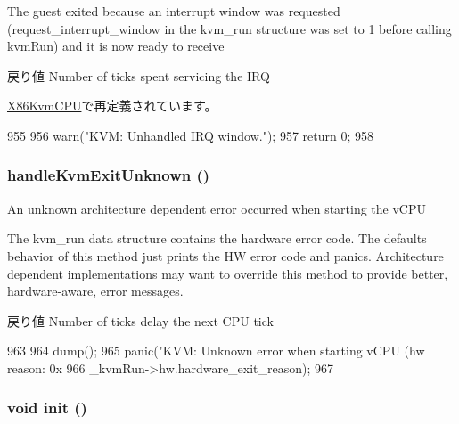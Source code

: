 The guest exited because an interrupt window was requested (request\_\-interrupt\_\-window in the kvm\_\-run structure was set to 1 before calling kvmRun) and it is now ready to receive

\begin{DoxyReturn}{戻り値}
Number of ticks spent servicing the IRQ 
\end{DoxyReturn}


\hyperlink{classX86KvmCPU_a405e34c9d079e8823ac2a1ca0e816a47}{X86KvmCPU}で再定義されています。


\begin{DoxyCode}
955 {
956     warn("KVM: Unhandled IRQ window.\n");
957     return 0;
958 }
\end{DoxyCode}
\hypertarget{classBaseKvmCPU_a00e63a4b01cf730bba2c42ef852b0876}{
\subsubsection[{handleKvmExitUnknown}]{ handleKvmExitUnknown ()}}
\label{classBaseKvmCPU_a00e63a4b01cf730bba2c42ef852b0876}
An unknown architecture dependent error occurred when starting the vCPU

The kvm\_\-run data structure contains the hardware error code. The defaults behavior of this method just prints the HW error code and panics. Architecture dependent implementations may want to override this method to provide better, hardware-\/aware, error messages.

\begin{DoxyReturn}{戻り値}
Number of ticks delay the next CPU tick 
\end{DoxyReturn}



\begin{DoxyCode}
963 {
964     dump();
965     panic("KVM: Unknown error when starting vCPU (hw reason: 0x%
966           _kvmRun->hw.hardware_exit_reason);
967 }
\end{DoxyCode}
\hypertarget{classBaseKvmCPU_a02fd73d861ef2e4aabb38c0c9ff82947}{
\subsubsection[{init}]{\setlength{\rightskip}{0pt plus 5cm}void init ()}}
\label{classBaseKvmCPU_a02fd73d861ef2e4aabb38c0c9ff82947}



